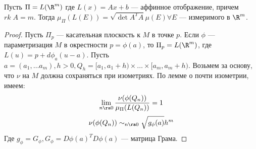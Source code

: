 \begin{lemma}
    Пусть \(\Pi = L(\R^m)\) где \(L(x) = Ax + b\) --- аффинное отображение, причем \(rk\;A = m\). Тогда \(\mu_\Pi(L(E)) = \sqrt{\det A^TA}\mu(E) \forall E\) --- измеримого в \(\R^m\).
\end{lemma}
\begin{proof}
    Пусть \(\Pi_p\) --- касательная плоскость к \(M\) в точке \(p\). Если \(\phi\) --- параметризация \(M\) в окрестности \(p = \phi(a)\), то \(\Pi_p = L(\R^m)\), где \(L(u) = p + d\phi_a(u - a)\). Пусть \(a = (a_1, \dots a_m), h > 0, Q_h = [a_1, a_1 + h) \times \dots \times [a_m, a_m + h)\). Возьмем за основу, что \(\nu\) на \(M\) должна сохраняться при изометриях. По лемме о почти изометрии, имеем:
    \[\lim_{n \ra 0} \frac{\nu(\phi(Q_n))}{\mu_\Pi(L(Q_n))} = 1\]
    \[\nu(\phi(Q_n)) \sim_{n \ra 0} \sqrt{g_\phi(a)}h^m\]
    Где \(g_\phi = G_\phi, G_\phi = D\phi(a)^TD\phi(a)\) --- матрица Грама.
\end{proof}
